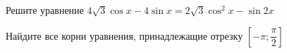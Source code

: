 \begin{ex}
	\begin{condition}
		\begin{enumcols}[label=\asbuk*)]
			\item Решите уравнение \( 4\sqrt{3}\cos x - 4\sin x = 2\sqrt{3}\cos^2 x -\sin 2x \)
			\item Найдите все корни уравнения, принадлежащие отрезку \( \left[-\pi;\dfrac{\pi}{2}\right]  \)
		\end{enumcols}
	\end{condition}
\end{ex}